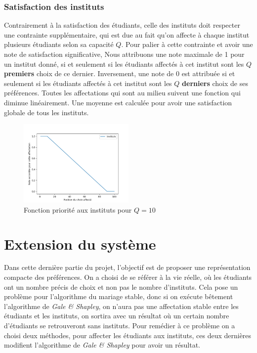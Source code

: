 \documentclass[12pt,titlepage]{article}
\begin{document}
\subsubsection*{Satisfaction des instituts}
Contrairement à la satisfaction des étudiants, celle des instituts doit respecter une contrainte supplémentaire, qui est due au fait qu'on affecte à chaque institut plusieurs étudiants selon sa capacité $Q$. Pour palier à cette contrainte et avoir une note de satisfaction significative, Nous attribuons une note maximale de 1 pour un institut donné, si et seulement si les étudiants affectés à cet institut sont les $Q$ \textbf{premiers} choix de ce dernier. Inversement, une note de 0 est attribuée si et seulement si les étudiants affectés à cet institut sont les $Q$ \textbf{derniers} choix de ses préférences. Toutes les affectations qui sont au milieu suivent une fonction qui diminue linéairement. Une moyenne est calculée pour avoir une satisfaction globale de tous les instituts.


\begin{figure}[!h]
\centering
\includegraphics[width = 0.5\textwidth]{img/instituts.png}
\caption{Fonction priorité aux instituts pour $Q = 10$}
\end{figure}

\begin{figure}

\end{figure}


\section{Extension du système}
Dans cette dernière partie du projet, l'objectif est de proposer une représentation compacte des préférences. On a choisi de se référer à la vie réelle, où les étudiants ont un nombre précis de choix et non pas le nombre d'instituts. Cela pose un problème pour l'algorithme du mariage stable, donc si on exécute bêtement l'algorithme de \textit{Gale \& Shapley}, on n'aura pas une affectation stable entre les étudiants et les instituts, on sortira avec un résultat où un certain nombre d'étudiants se retrouveront sans instituts. Pour remédier à ce problème on a choisi deux méthodes, pour affecter les étudiants aux instituts, ces deux dernières modifient l'algorithme de \textit{Gale \& Shapley} pour avoir un résultat.
\end{document}
